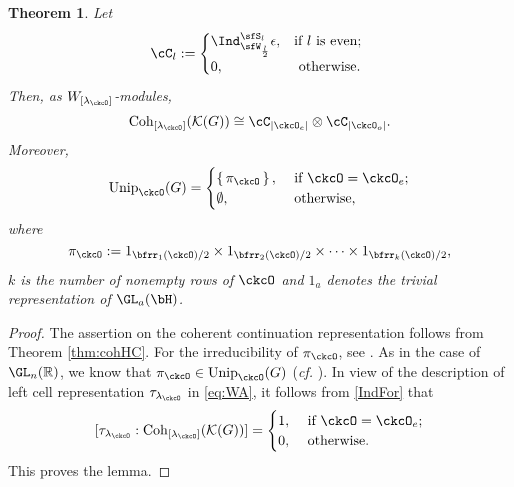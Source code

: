\documentclass[12pt,a4paper]{amsart}
\def\abs#1{\left|{#1}\right|}
\newcommand{\CK}{{\mathcal {K}}}
\newcommand{\R}{\mathbb R}
\numberwithin{equation}{section}
\newtheorem{thm}{Theorem}[section]
\theoremstyle{remark}
\def\cf{\emph{cf.} }
\def\Unip{\mathrm{Unip}}
\def\lamck{\lambda_\ckcO}
\def\Cint#1{\Coh_{[#1]}}
\def\Coh{\mathrm{Coh}}
\begin{document}
\begin{thm}\label{thm:mainH}
  Let
  \[
  \cC_{l}: = \begin{cases}
    \Ind_{\sfW_{\frac{l}{2}}}^{\sfS_{l}}\epsilon,
    & \text{if $l$ is even;}  \\
      0, & \text{ otherwise. } \\
    \end{cases}
  \]
  Then, as $W_{[\lamck]}$-modules,
  \[
    \Cint{\lamck}(\CK(G))  \cong
    \cC_{\abs{\ckcO_{e}}}\otimes \cC_{\abs{\ckcO_{o}}}.
  \]
Moreover,
 \[
\Unip_{\ckcO}(G)  = \begin{cases}
   \set{\pi_{\ckcO}},
    & \text{ if $\ckcO = \ckcO_{e}$;}  \\
      \emptyset, & \text{ otherwise, } \\
    \end{cases}
  \]
where
  \[
    \pi_{\ckcO} := 1_{\bfrr_1(\ckcO)/2}\times 1_{\bfrr_2(\ckcO)/2} \times \cdots
   \times  1_{\bfrr_k(\ckcO)/2},
  \]
  $k$ is the number of nonempty rows of $\ckcO$
  and $1_{a}$ denotes the trivial representation of $\GL_{a}(\bH)$.

\end{thm}
\begin{proof} The assertion on the coherent continuation representation follows from Theorem \ref{thm:cohHC}. For the irreducibility of $\pi_{\ckcO}$, see \cite[Theorem 3.8]{V.GL}. As in the case of $\GL_n(\R)$, we know that $\pi_{\ckcO}\in \Unip_{\ckcO}(G)$ (\cf \cite[Lemma 8.3]{BVUni}).
In view of the description of left cell representation $\tau_{\lamck}$ in \eqref{eq:WA}, it follows from \eqref{IndFor} that
\[
[\tau_{\lamck}:\Cint{\lamck}(\CK(G))]  = \begin{cases}
   1,
    & \text{ if $\ckcO = \ckcO_{e}$;}  \\
      0, & \text{ otherwise.} \\
    \end{cases}
  \]
This proves the lemma. %
\end{proof}
\end{document}
